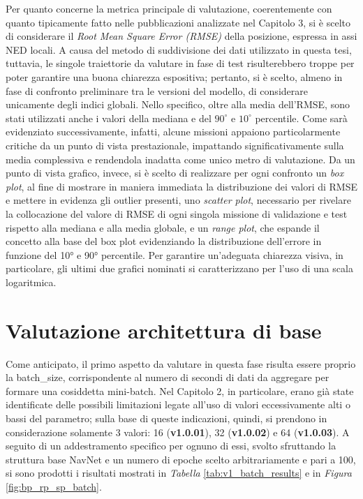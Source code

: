 Per quanto concerne la metrica principale di valutazione, coerentemente con quanto tipicamente fatto nelle pubblicazioni analizzate nel Capitolo 3, si è scelto di considerare il \emph{Root Mean Square Error (RMSE)} della posizione, espressa in assi NED locali. A causa del metodo di suddivisione dei dati utilizzato in questa tesi, tuttavia, le singole traiettorie da valutare in fase di test risulterebbero troppe per poter garantire una buona chiarezza espositiva; pertanto, si è scelto, almeno in fase di confronto preliminare tra le versioni del modello, di considerare unicamente degli indici globali. Nello specifico, oltre alla media dell'RMSE, sono stati utilizzati anche i valori della mediana e del $90^\circ$ e $10^\circ$ percentile. Come sarà evidenziato successivamente, infatti, alcune missioni appaiono particolarmente critiche da un punto di vista prestazionale, impattando significativamente sulla media complessiva e rendendola inadatta come unico metro di valutazione. Da un punto di vista grafico, invece, si è scelto di realizzare per ogni confronto un \textit{box plot}, al fine di mostrare in maniera immediata la distribuzione dei valori di RMSE e mettere in evidenza gli outlier presenti, uno \textit{scatter plot}, necessario per rivelare la collocazione del valore di RMSE di ogni singola missione di validazione e test rispetto alla mediana e alla media globale, e un \textit{range plot}, che espande il concetto alla base del box plot evidenziando la distribuzione dell'errore in funzione del 10° e 90° percentile. Per garantire un'adeguata chiarezza visiva, in particolare, gli ultimi due grafici nominati si caratterizzano per l'uso di una scala logaritmica.

\section{Valutazione architettura di base}

Come anticipato, il primo aspetto da valutare in questa fase risulta essere proprio la batch\_size, corrispondente al numero di secondi di dati da aggregare per formare una cosiddetta mini-batch. Nel Capitolo 2, in particolare, erano già state identificate delle possibili limitazioni legate all'uso di valori eccessivamente alti o bassi del parametro; sulla base di queste indicazioni, quindi, si prendono in considerazione solamente 3 valori: 16 (\textbf{v1.0.01}), 32 (\textbf{v1.0.02}) e 64 (\textbf{v1.0.03}). A seguito di un addestramento specifico per ognuno di essi, svolto sfruttando la struttura base NavNet e un numero di epoche scelto arbitrariamente e pari a 100, si sono prodotti i risultati mostrati in \emph{Tabella} \ref{tab:v1_batch_results} e in \emph{Figura} \ref{fig:bp_rp_sp_batch}.

